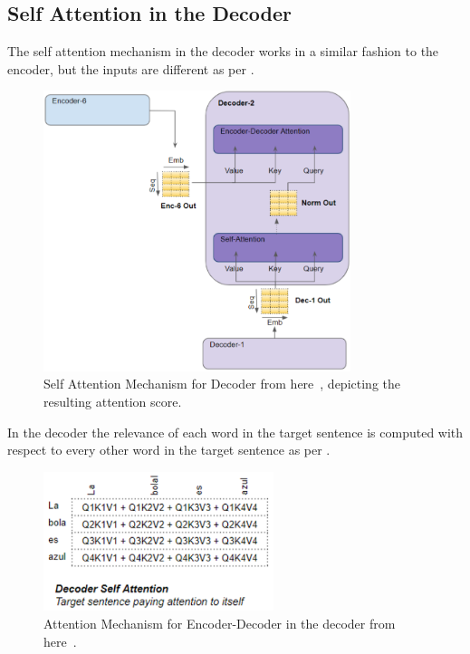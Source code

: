 \subsection{Self Attention in the Decoder}
The self attention mechanism in the decoder works in a similar fashion to the encoder, but the inputs are different as per .
\begin{figure}[H]
	\centering
	\includegraphics[width=0.8\textwidth]{figures/atn_decoder.png}
	\caption{Self Attention Mechanism for Decoder from here~\autocite{doshiTransformersExplainedVisually2021b}, depicting the resulting attention score.}
	\label{fig:atn_decoder}
\end{figure}
In the decoder the relevance of each word in the target sentence is computed with respect to every other word in the target sentence
as per .
\begin{figure}[H]
	\centering
	\includegraphics[width=0.6\textwidth]{figures/decoder_self_atn.png}
	\caption{Attention Mechanism for Encoder-Decoder in the decoder from here~\autocite{doshiTransformersExplainedVisually2021b}.}
	\label{fig:decoder_self_atn}
\end{figure}
